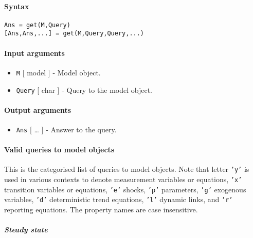 


	\paragraph{Syntax}\label{syntax}

\begin{verbatim}
Ans = get(M,Query)
[Ans,Ans,...] = get(M,Query,Query,...)
\end{verbatim}

\paragraph{Input arguments}\label{input-arguments}

\begin{itemize}
\item
  \texttt{M} {[} model {]} - Model object.
\item
  \texttt{Query} {[} char {]} - Query to the model object.
\end{itemize}

\paragraph{Output arguments}\label{output-arguments}

\begin{itemize}
\itemsep1pt\parskip0pt
\item
  \texttt{Ans} {[} \ldots{} {]} - Answer to the query.
\end{itemize}

\paragraph{Valid queries to model
objects}\label{valid-queries-to-model-objects}

This is the categorised list of queries to model objects. Note that
letter \texttt{'y'} is used in various contexts to denote measurement
variables or equations, \texttt{'x'} transition variables or equations,
\texttt{'e'} shocks, \texttt{'p'} parameters, \texttt{'g'} exogenous
variables, \texttt{'d'} deterministic trend equations, \texttt{'l'}
dynamic links, and \texttt{'r'} reporting equations. The property names
are case insensitive.

\subparagraph{Steady state}\label{steady-state}

